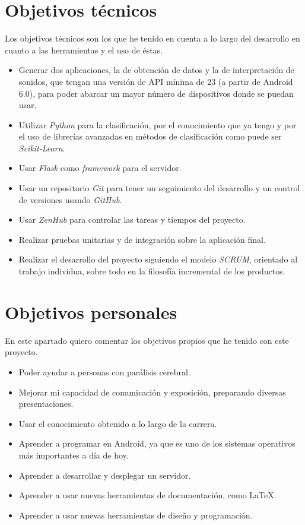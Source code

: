 \section{Objetivos técnicos}
Los objetivos técnicos son los que he tenido en cuenta a lo largo del desarrollo en cuanto a las herramientas y el uso de éstas.
\begin{itemize}
	\item
	Generar dos aplicaciones, la de obtención de datos y la de interpretación de sonidos, que tengan una versión de API mínima de 23 (a partir de Android 6.0), para poder abarcar un mayor número de dispositivos donde se puedan usar.
	\item 
	Utilizar \textit{Python} para la clasificación, por el conocimiento que ya tengo y por el uso de librerías avanzadas en métodos de clasificación como puede ser \textit{Scikit-Learn}.
	\item
	Usar \textit{Flask} como \textit{framework} para el servidor.
	\item 
	Usar un repositorio \textit{Git} para tener un seguimiento del desarrollo y un control de versiones usando \textit{GitHub}.
	\item 
	Usar \textit{ZenHub} para controlar las tareas y tiempos del proyecto.
	\item
	Realizar pruebas unitarias y de integración sobre la aplicación final.
	\item
	Realizar el desarrollo del proyecto siguiendo el modelo \textit{SCRUM}, orientado al trabajo individua, sobre todo en la filosofía incremental de los productos.
\end{itemize}

\section{Objetivos personales}\label{objpers}
En este apartado quiero comentar los objetivos propios que he tenido con este proyecto.
\begin{itemize}
	\item
	Poder ayudar a personas con parálisis cerebral.
	\item 
	Mejorar mi capacidad de comunicación y exposición, preparando diversas presentaciones.
	\item
	Usar el conocimiento obtenido a lo largo de la carrera.
	\item 
	Aprender a programar en Android, ya que es uno de los sistemas operativos más importantes a día de hoy.
	\item 
	Aprender a desarrollar y desplegar un servidor.
	\item 
	Aprender a usar nuevas herramientas de documentación, como \LaTeX.
	\item 
	Aprender a usar nuevas herramientas de diseño y programación.
\end{itemize}